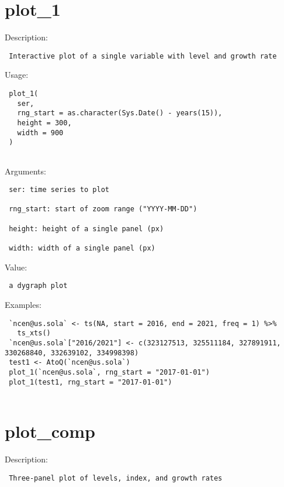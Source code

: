 \documentclass[
  letterpaper,
  DIV=11,
  numbers=noendperiod]{scrreport}
\begin{document}
\hypertarget{plot_1}{%
\section{plot\_1}\label{plot_1}}

Description:

\begin{verbatim}
 Interactive plot of a single variable with level and growth rate
\end{verbatim}

Usage:

\begin{verbatim}
 plot_1(
   ser,
   rng_start = as.character(Sys.Date() - years(15)),
   height = 300,
   width = 900
 )
 
\end{verbatim}

Arguments:

\begin{verbatim}
 ser: time series to plot

 rng_start: start of zoom range ("YYYY-MM-DD")

 height: height of a single panel (px)

 width: width of a single panel (px)
\end{verbatim}

Value:

\begin{verbatim}
 a dygraph plot
\end{verbatim}

Examples:

\begin{verbatim}
 `ncen@us.sola` <- ts(NA, start = 2016, end = 2021, freq = 1) %>% 
   ts_xts()
 `ncen@us.sola`["2016/2021"] <- c(323127513, 325511184, 327891911, 330268840, 332639102, 334998398)
 test1 <- AtoQ(`ncen@us.sola`)
 plot_1(`ncen@us.sola`, rng_start = "2017-01-01")
 plot_1(test1, rng_start = "2017-01-01")
 
\end{verbatim}

\hypertarget{plot_comp}{%
\section{plot\_comp}\label{plot_comp}}

Description:

\begin{verbatim}
 Three-panel plot of levels, index, and growth rates
\end{verbatim}
\end{document}

